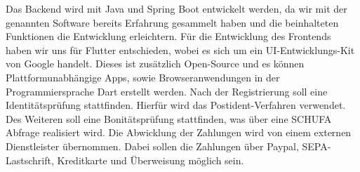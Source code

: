 Das Backend wird mit Java und Spring Boot entwickelt werden, da wir mit der
genannten Software bereits Erfahrung gesammelt haben und die beinhalteten Funktionen
die Entwicklung erleichtern.
Für die Entwicklung des Frontends haben wir uns für Flutter entschieden,
wobei es sich um ein UI-Entwicklungs-Kit von Google handelt.
Dieses ist zusätzlich Open-Source und es können Plattformunabhängige Apps, sowie Browseranwendungen in der
Programmiersprache Dart erstellt werden.
Nach der Registrierung soll eine Identitätsprüfung stattfinden.
Hierfür wird das Postident-Verfahren verwendet.
Des Weiteren soll eine Bonitätsprüfung stattfinden, was über eine SCHUFA Abfrage realisiert wird.
Die Abwicklung der Zahlungen wird von einem externen Dienstleister übernommen.
Dabei sollen die Zahlungen über Paypal, SEPA-Lastschrift, Kreditkarte und Überweisung möglich sein.